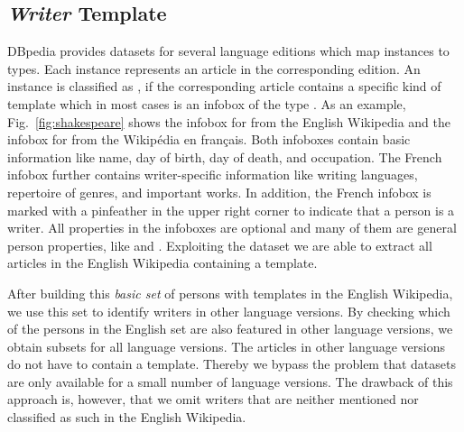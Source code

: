 \documentclass[a4paper,12pt]{scrartcl}
\begin{document}


\subsection{\emph{Writer} Template}\label{sec:writer_infoboxes_english}

DBpedia provides  datasets for several
language editions which map instances to types. Each instance
represents an article in the corresponding edition. An instance is
classified as , if the corresponding article contains a
specific kind of template which in most cases is an infobox of the
type .
%
%
As an example, Fig.~\ref{fig:shakespeare} shows the infobox for
 from the English
Wikipedia %
and the infobox for  from the Wikipédia en français.
%
%
Both infoboxes contain basic information like name, day of birth,
day of death, and occupation. The French infobox further
contains writer-specific information like writing
languages, repertoire of genres, and important works.
In addition, the French  infobox is marked with a
pinfeather in the upper right corner to indicate that a person
is a writer.
%
All properties in the infoboxes are optional and many of them are
general person properties, like  and
. Exploiting the 
dataset we are able to extract all articles in the English Wikipedia
containing a  template.

After building this \emph{basic set} of persons with 
templates in the English Wikipedia, we use this set to identify
writers in other language versions. By checking which of the persons
in the English set are also featured in other language versions, we
obtain subsets for all language versions. The articles in other
language versions do not have to contain a 
template. Thereby we bypass the problem that 
datasets are only available for a small number of language
versions. The drawback of this approach is, however, that we omit
writers that are neither mentioned nor classified as such in the
English Wikipedia.
\end{document}
